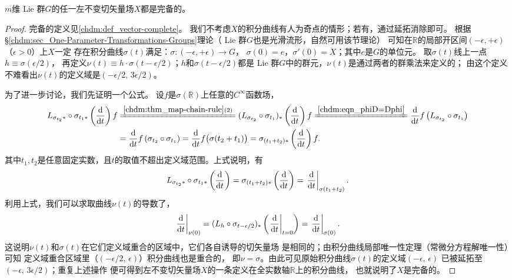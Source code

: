 \begin{theorem}\label{chlg:thm_comlv}
    $m$维 Lie 群$G$的任一左不变切矢量场$X$都是完备的。
\end{theorem}
\begin{proof}
    完备的定义见\ref{chdm:def_vector-complete}。
    我们不考虑$X$的积分曲线有人为奇点的情形；若有，通过延拓消除即可。
    根据\S \ref{chdm:sec_One-Parameter-Transformations-Groups}理论（ Lie 群$G$也是光滑流形，自然可用该节理论）
    可知在$\mathbb{R}$的局部开区间$(-\epsilon,+\epsilon)$（$\epsilon>0$）上$X$一定
    存在积分曲线$\sigma(t)$满足：$\sigma:(-\epsilon,+\epsilon) \to G$，
    $\sigma(0)=e$，$\sigma'(0)=X$；其中$e$是$G$的单位元。
    取$\sigma(t)$线上一点$h\equiv \sigma(\epsilon/2)$，
    再定义$\nu(t)\equiv h\cdot \sigma(t-\epsilon/2)$；$h$和$\sigma(t-\epsilon/2)$都是
     Lie 群$G$中的群元，$\nu(t)$是通过两者的群乘法来定义的；
    由这个定义不难看出$\nu(t)$的定义域是$(-\epsilon/2,\, 3\epsilon/2) $。
    
    为了进一步讨论，我们先证明一个公式。
    设$f$是$\sigma(\mathbb{R})$上任意的$C^\infty$函数场，
    \begin{align*}
        L_{\sigma_{t_2}*}\circ \sigma_{t_1*}\left(\frac{{\rm d}}{{\rm d}t}\right)f 
        &\xlongequal{\ref{chdm:thm_map-chain-rule}(2)}
        (L_{\sigma_{t_2}}\circ \sigma_{t_1})_{*}\left(\frac{{\rm d}}{{\rm d}t}\right)f 
        \xlongequal{\ref{chdm:eqn_phiD=Dphi}}
        \frac{{\rm d}}{{\rm d}t}f\left(L_{\sigma_{t_2}}\circ \sigma_{t_1}\right) \\
        &=\frac{{\rm d}}{{\rm d}t}f\left(\sigma_{t_2}\circ \sigma_{t_1}\right)
        =\frac{{\rm d}}{{\rm d}t}f\bigl(\sigma({t_2+t_1})\bigr)
        =\sigma_{(t_1+t_2)*}\left(\frac{{\rm d}}{{\rm d}t}\right)f.
    \end{align*}
    其中$t_1,t_2$是任意固定实数，且$t$的取值不超出定义域范围。上式说明，有
    \begin{equation}\label{chlg:eqn_lst}
        L_{\sigma_{t_2}*}\circ\sigma_{t_1*}\left(\frac{{\rm d}}{{\rm d}t}\right)
        =\sigma_{(t_1+t_2)*}\left(\frac{{\rm d}}{{\rm d}t}\right)
        =\left. \frac{{\rm d}}{{\rm d}t}\right|_{\sigma(t_1+t_2)}.
    \end{equation}
    利用上式，我们可以求取曲线$\nu(t)$的导数了，
    \begin{equation}
        \left. \frac{{\rm d}}{{\rm d}t}\right|_{\nu(0)} = 
        (L_{h}\circ \sigma_{t-\epsilon/2})_{*}
        \left(\left. \frac{{\rm d}}{{\rm d}t}\right|_{t=0}\right)
        =\left. \frac{{\rm d}}{{\rm d}t}\right|_{\sigma(0)} .
    \end{equation}
    这说明$\nu(t)$和$\sigma(t)$在它们定义域重合的区域中，它们各自诱导的切矢量场
    是相同的；由积分曲线局部唯一性定理（常微分方程解唯一性）可知
    定义域重合区域里（$(-\epsilon/2,\, \epsilon)$）积分曲线也是重合的，
    即$\nu = \sigma$。由此可见原始积分曲线$\sigma(t)$的定义域$(-\epsilon,\, \epsilon) $
    已被延拓至$(-\epsilon,\, 3\epsilon/2) $；重复上述操作
    便可得到左不变切矢量场$X$的一条定义在全实数轴$\mathbb{R}$上的积分曲线，
    也就说明了$X$是完备的。
\end{proof}


